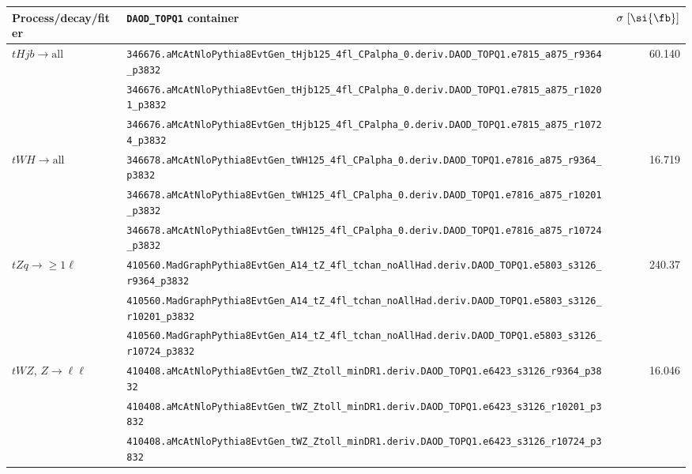 \begin{table}[htbp]\centering
{\tiny
\begin{tabular}{l|l|r}
\toprule
\hline
Process/decay/fiter & \verb|DAOD_TOPQ1| container                                                    & $\mathrm{\sigma~[\si{\fb}]}$ \\ \hline\hline
\multirow{3}{*}{$tHjb\to\mathrm{all}$}             & \verb|346676.aMcAtNloPythia8EvtGen_tHjb125_4fl_CPalpha_0.deriv.DAOD_TOPQ1.e7815_a875_r9364_p3832|       &  \multirow{3}{*}{60.140} \\
                                                   & \verb|346676.aMcAtNloPythia8EvtGen_tHjb125_4fl_CPalpha_0.deriv.DAOD_TOPQ1.e7815_a875_r10201_p3832|      &  \\
                                                   & \verb|346676.aMcAtNloPythia8EvtGen_tHjb125_4fl_CPalpha_0.deriv.DAOD_TOPQ1.e7815_a875_r10724_p3832|      & \\ \hline

\multirow{3}{*}{$tWH\to\mathrm{all}$}              & \verb|346678.aMcAtNloPythia8EvtGen_tWH125_4fl_CPalpha_0.deriv.DAOD_TOPQ1.e7816_a875_r9364_p3832|        &  \multirow{3}{*}{16.719} \\
                                                   & \verb|346678.aMcAtNloPythia8EvtGen_tWH125_4fl_CPalpha_0.deriv.DAOD_TOPQ1.e7816_a875_r10201_p3832|       &  \\
                                                   & \verb|346678.aMcAtNloPythia8EvtGen_tWH125_4fl_CPalpha_0.deriv.DAOD_TOPQ1.e7816_a875_r10724_p3832|       & \\ \hline

\multirow{3}{*}{$tZq\to\geq1\ell$}                 & \verb|410560.MadGraphPythia8EvtGen_A14_tZ_4fl_tchan_noAllHad.deriv.DAOD_TOPQ1.e5803_s3126_r9364_p3832|  &  \multirow{3}{*}{240.37} \\
                                                   & \verb|410560.MadGraphPythia8EvtGen_A14_tZ_4fl_tchan_noAllHad.deriv.DAOD_TOPQ1.e5803_s3126_r10201_p3832| &  \\
                                                   & \verb|410560.MadGraphPythia8EvtGen_A14_tZ_4fl_tchan_noAllHad.deriv.DAOD_TOPQ1.e5803_s3126_r10724_p3832| & \\ \hline

\multirow{3}{*}{$tWZ$, $Z\to\ell\ell$}             & \verb|410408.aMcAtNloPythia8EvtGen_tWZ_Ztoll_minDR1.deriv.DAOD_TOPQ1.e6423_s3126_r9364_p3832|           &  \multirow{3}{*}{16.046} \\
                                                   & \verb|410408.aMcAtNloPythia8EvtGen_tWZ_Ztoll_minDR1.deriv.DAOD_TOPQ1.e6423_s3126_r10201_p3832|          &  \\
                                                   & \verb|410408.aMcAtNloPythia8EvtGen_tWZ_Ztoll_minDR1.deriv.DAOD_TOPQ1.e6423_s3126_r10724_p3832|          & \\ \hline


\end{tabular}}
\end{table}
